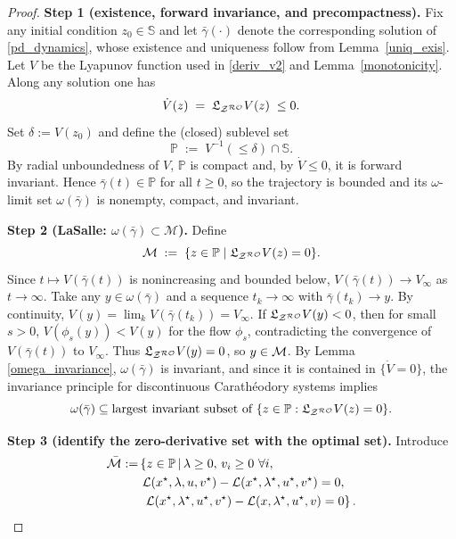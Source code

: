 \documentclass[journal,twoside,web]{ieeecolor}
\newcommand{\rev}[1]{\textcolor{revisionblue}{#1}}
\begin{document}
\begin{proof}
\rev{\textbf{Step 1 (existence, forward invariance, and precompactness).}
Fix any initial condition $z_0\in\mathbb S$ and let $\bar\gamma(\cdot)$ denote the corresponding solution of \eqref{pd_dynamics}, whose existence and uniqueness follow from Lemma~\ref{uniq_exis}.
Let $V$ be the Lyapunov function used in \eqref{deriv_v2} and Lemma~\ref{monotonicity}. Along any solution one has
\[
\dot V(z)\;=\;\mathfrak{L}_{{\cal Z}^{\cal RO}}V(z)\;\le 0.
\]
Set $\delta:=V(z_0)$ and define the (closed) sublevel set
\[
\mathbb P\;:=\;V^{-1}(\le \delta)\cap \mathbb S.
\]
By radial unboundedness of $V$, $\mathbb P$ is compact and, by $\dot V\le 0$, it is forward invariant. Hence $\bar\gamma(t)\in\mathbb P$ for all $t\ge 0$, so the trajectory is bounded and its $\omega$-limit set $\omega(\bar\gamma)$ is nonempty, compact, and invariant.}

\medskip
\rev{\textbf{Step 2 (LaSalle: $\omega(\bar\gamma)\subset \mathcal M$).}
Define
\[
{\cal M}\;:=\;\{z\in \mathbb P\mid \mathfrak{L}_{{\cal Z}^{\cal RO}}V(z)=0\}.
\]
Since $t\mapsto V(\bar\gamma(t))$ is nonincreasing and bounded below, $V(\bar\gamma(t))\to V_\infty$ as $t\to\infty$.
Take any $y\in \omega(\bar\gamma)$ and a sequence $t_k\to\infty$ with $\bar\gamma(t_k)\to y$. By continuity, $V(y)=\lim_k V(\bar\gamma(t_k))=V_\infty$.
If $\mathfrak{L}_{{\cal Z}^{\cal RO}}V(y)<0$, then for small $s>0$, $V(\phi_s(y))<V(y)$ for the flow $\phi_s$, contradicting the convergence of $V(\bar\gamma(t))$ to $V_\infty$.
Thus $\mathfrak{L}_{{\cal Z}^{\cal RO}}V(y)=0$, so $y\in{\cal M}$. By Lemma \ref{omega_invariance}, $\omega(\bar\gamma)$ is invariant, and since it is contained in $\{\dot V=0\}$, the invariance principle for discontinuous Carathéodory systems \cite[Prop.~2.1]{cherukuri2016} implies
\[
\omega(\bar\gamma)\subseteq \text{largest invariant subset of }\{z\in\mathbb P:\mathfrak{L}_{{\cal Z}^{\cal RO}}V(z)=0\}.
\]}

\medskip
{\color{proofpurple}\textbf{Step 3 (identify the zero-derivative set with the optimal set).}
Introduce
\begin{align}
\bar{\cal M}:=& \left\{z \in \mathbb P\,\middle|\,\lambda\geq 0,\, v_i\geq 0\ \forall i,\right.\nonumber\\
&\ {\cal L}(x^\star,\lambda,u,v^\star)-{\cal L}(x^\star,\lambda^\star,u^\star,v^\star)=0,\nonumber\\
&\left.\ {\cal L}(x^\star,\lambda^\star,u^\star,v^\star)-{\cal L}(x,\lambda^\star,u^\star,v)=0 \right\}.
\label{sad_copy}
\end{align}}


\end{proof}
\end{document}
